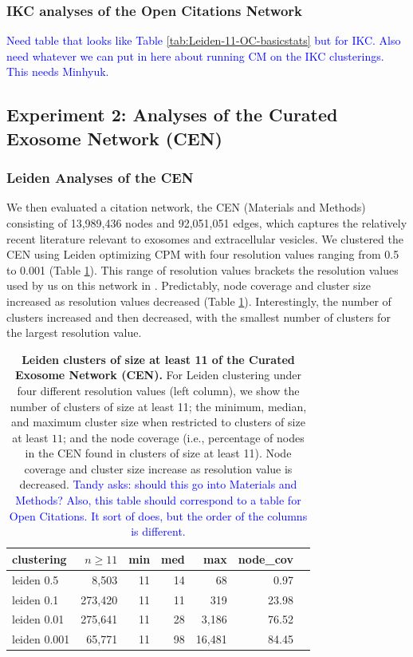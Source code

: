 \documentclass[11pt]{article}   	%
\begin{document}
\subsubsection{IKC analyses of the Open Citations Network}

\textcolor{blue}{Need table that looks like Table \ref{tab:Leiden-11-OC-basicstats} but for IKC. Also need whatever we can put in here about running CM on the IKC clusterings. This needs Minhyuk.}
\subsection{Experiment 2: Analyses of the Curated Exosome Network (CEN)}

\subsubsection{Leiden Analyses of the CEN}

We then evaluated a citation network, the CEN (Materials and Methods) consisting of 13,989,436 nodes and 92,051,051 edges, which captures the relatively recent literature relevant to exosomes and extracellular vesicles. We clustered the CEN using Leiden optimizing CPM with  four resolution values ranging from 0.5 to 0.001 (Table \ref{tab:CEN-table1}). This range of resolution values brackets the resolution values used by us on this network in   \cite{Jakatdar_2022}.
Predictably, node coverage and cluster size increased as resolution values  decreased (Table \ref{tab:CEN-table1}).
Interestingly, the number of clusters increased and then decreased, with the smallest number of clusters for the largest
resolution value.


\begin{table}[ht]
\centering
\begin{tabular}{lrrrrrr}
  \hline
 clustering & $n \geq 11$ & min & med & max & node\_cov \\
  \hline
 leiden 0.5 &   8,503 & 11 & 14 & 68 & 0.97 \\
 leiden 0.1 &   273,420 & 11 & 11 & 319 & 23.98 \\
  leiden 0.01   & 275,641 & 11 & 28 & 3,186 & 76.52 \\
  leiden 0.001   &65,771 & 11 & 98 & 16,481 & 84.45 \\
   \hline
\end{tabular}
\caption{\textbf{Leiden clusters of size at least 11 of the Curated Exosome Network (CEN).}
For Leiden clustering under four different resolution values (left column), we show  the number of clusters of size at least 11;  the minimum, median, and
maximum cluster size when restricted to clusters of size at least $11$; and the node coverage (i.e., percentage of nodes in the CEN found in clusters of size at least 11).
Node coverage and cluster size increase as resolution value is decreased.
\textcolor{blue}{Tandy asks: should this go into Materials and Methods? Also, this table should correspond to a table for Open Citations. It sort of does, but the
order of the columns is different. }
}
\label{tab:CEN-table1}
\end{table}
\end{document}
